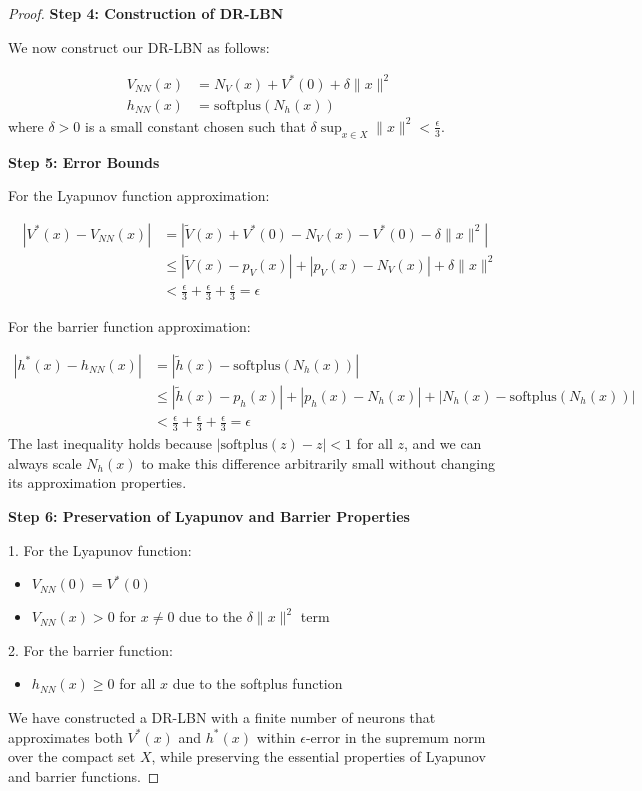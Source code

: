 \documentclass[11pt, oneside]{article}
\begin{document}
\begin{proof}
\textbf{Step 4: Construction of DR-LBN}

We now construct our DR-LBN as follows:

\begin{align}
    V_{NN}(x) &= N_V(x) + V^*(0) + \delta \|x\|^2 \\
    h_{NN}(x) &= \text{softplus}(N_h(x))
\end{align}
%
where $\delta > 0$ is a small constant chosen such that $\delta \sup_{x \in X} \|x\|^2 < \frac{\epsilon}{3}$.

\textbf{Step 5: Error Bounds}

For the Lyapunov function approximation:

\begin{align}
    |V^*(x) - V_{NN}(x)| &= |\tilde{V}(x) + V^*(0) - N_V(x) - V^*(0) - \delta \|x\|^2| \\
    &\leq |\tilde{V}(x) - p_V(x)| + |p_V(x) - N_V(x)| + \delta \|x\|^2 \\
    &< \frac{\epsilon}{3} + \frac{\epsilon}{3} + \frac{\epsilon}{3} = \epsilon
\end{align}

For the barrier function approximation:

\begin{align}
    |h^*(x) - h_{NN}(x)| &= |\tilde{h}(x) - \text{softplus}(N_h(x))| \\
    &\leq |\tilde{h}(x) - p_h(x)| + |p_h(x) - N_h(x)| + |N_h(x) - \text{softplus}(N_h(x))| \\
    &< \frac{\epsilon}{3} + \frac{\epsilon}{3} + \frac{\epsilon}{3} = \epsilon
\end{align}
%
The last inequality holds because $|\text{softplus}(z) - z| < 1$ for all $z$, and we can always scale $N_h(x)$ to make this difference arbitrarily small without changing its approximation properties.

\textbf{Step 6: Preservation of Lyapunov and Barrier Properties}

1. For the Lyapunov function:
\begin{itemize}
    \item $V_{NN}(0) = V^*(0)$
    \item $V_{NN}(x) > 0$ for $x \neq 0$ due to the $\delta \|x\|^2$ term

\end{itemize}
2. For the barrier function:

\begin{itemize}
    \item $h_{NN}(x) \geq 0$ for all $x$ due to the softplus function
\end{itemize}
%
We have constructed a DR-LBN with a finite number of neurons that approximates both $V^*(x)$ and $h^*(x)$ within $\epsilon$-error in the supremum norm over the compact set $X$, while preserving the essential properties of Lyapunov and barrier functions.
\end{proof}
\end{document}
